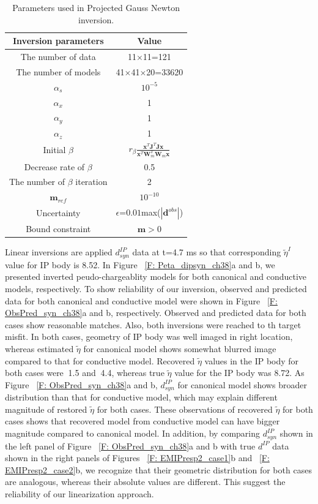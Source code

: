 \documentclass[a4paper, 11pt]{article}
\newcommand{\peta}{\tilde{\eta}}
\newcommand{\dip}{d^{IP}}
\begin{document}
\begin{table}[ht]
\caption{Parameters used in Projected Gauss Newton inversion.} %
\centering %
\begin{tabular}{c c} %
\hline\hline %
Inversion parameters & Value \\
[0.1ex] %
\hline
The number of data &    11$\times$11=121 \\
The number of models &  41$\times$41$\times$20=33620 \\
$\alpha_s$ &  $10^{-5}$\\
$\alpha_x$ &  1\\
$\alpha_y$ &  1\\
$\alpha_z$ &  1\\
Initial $\beta$ &  $r_{\beta}\frac{\mathbf{x}^T\mathbf{J}^T\mathbf{J}\mathbf{x}}{\mathbf{x}^T\mathbf{W}_m^T\mathbf{W}_m\mathbf{x}}$\\
Decrease rate of $\beta$ &  0.5\\
The number of $\beta$ iteration & 2\\
$\mathbf{m}_{ref}$ & $10^{-10}$ \\
Uncertainty & $\epsilon$=$0.01$max($|\mathbf{d}^{obs}|$) \\
Bound constraint & $\mathbf{m} > 0$\\
\hline %
\end{tabular}
\label{table:1} %
\end{table}

Linear inversions are applied $d^{IP}_{syn}$ data at t=4.7 ms so that corresponding $\peta^I$ value for IP body is 8.52. In Figure ~\ref{F: Peta_dipsyn_ch38}a and b, we presented inverted peudo-chargeablity models for both canonical and conductive models, respectively. To show reliability of our inversion, observed and predicted data for both canonical and conductive model were shown in Figure ~\ref{F: ObsPred_syn_ch38}a and b, respectively. Observed and predicted data for both cases show reasonable matches. Also, both inversions were reached to th target misfit. In both cases, geometry of IP body was well imaged in right location, whereas estimated $\peta$ for canonical model shows somewhat blurred image compared to that for conductive model. Recovered $\peta$ values in the IP body for both cases were $~$1.5 and $~$4.4, whereas true $\peta$ value for the IP body was 8.72. As Figure ~\ref{F: ObsPred_syn_ch38}a and b, $d^{IP}_{syn}$ for canonical model shows broader distribution than that for conductive model, which may explain different magnitude of restored $\peta$ for both cases. These observations of recovered $\peta$ for both cases shows that recovered model from conductive model can have bigger magnitude compared to canonical model. In addition, by comparing $d^{IP}_{syn}$ shown in the left panel of Figure ~\ref{F: ObsPred_syn_ch38}a and b with true $\dip$ data shown in the right panels of Figures ~\ref{F: EMIPresp2_case1}b and ~\ref{F: EMIPresp2_case2}b, we recognize that their geometric distribution for both cases are analogous, whereas their absolute values are different. This suggest the reliability of our linearization approach.
\end{document}
